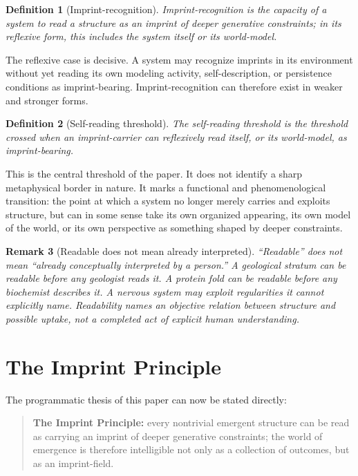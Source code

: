 \documentclass[12pt]{article}
\newtheorem{definition}{Definition}[section]
\newtheorem{remark}[definition]{Remark}
\begin{document}
\begin{definition}[Imprint-recognition]
\emph{Imprint-recognition} is the capacity of a system to read a structure as an imprint of deeper generative constraints; in its reflexive form, this includes the system itself or its world-model.
\end{definition}

The reflexive case is decisive. A system may recognize imprints in its environment without yet reading its own modeling activity, self-description, or persistence conditions as imprint-bearing. Imprint-recognition can therefore exist in weaker and stronger forms.

\begin{definition}[Self-reading threshold]
The \emph{self-reading threshold} is the threshold crossed when an imprint-carrier can reflexively read itself, or its world-model, as imprint-bearing.
\end{definition}

This is the central threshold of the paper. It does not identify a sharp metaphysical border in nature. It marks a functional and phenomenological transition: the point at which a system no longer merely carries and exploits structure, but can in some sense take its own organized appearing, its own model of the world, or its own perspective as something shaped by deeper constraints.

\begin{remark}[Readable does not mean already interpreted]
``Readable'' does not mean ``already conceptually interpreted by a person.'' A geological stratum can be readable before any geologist reads it. A protein fold can be readable before any biochemist describes it. A nervous system may exploit regularities it cannot explicitly name. Readability names an objective relation between structure and possible uptake, not a completed act of explicit human understanding.
\end{remark}

\section{The Imprint Principle}

The programmatic thesis of this paper can now be stated directly:

\begin{quote}
\textbf{The Imprint Principle:} every nontrivial emergent structure can be read as carrying an imprint of deeper generative constraints; the world of emergence is therefore intelligible not only as a collection of outcomes, but as an imprint-field.
\end{quote}
\end{document}

